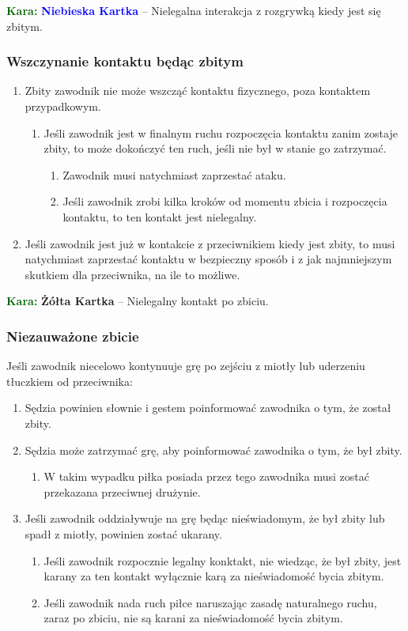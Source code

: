 \documentclass[11pt,a4paper]{article}
\newcommand\yellowcard[1]{\bgroup\textcolor{darkgreen}{\textbf{Kara: }}\bgroup\textcolor{darkyellow}{\textbf{Żółta Kartka}} -- #1}
\newcommand\bluecard[1]{\bgroup\textcolor{darkgreen}{\textbf{Kara: }}\bgroup\textcolor{blue}{\textbf{Niebieska Kartka}} -- #1}
\begin{document}
\bluecard{Nielegalna interakcja z rozgrywką kiedy jest się zbitym.}

\subsubsection{Wszczynanie kontaktu będąc zbitym}
\begin{enumerate}
  \item Zbity zawodnik nie może wszcząć kontaktu fizycznego, poza kontaktem przypadkowym.
  \begin{enumerate}
    \item Jeśli zawodnik jest w finalnym ruchu rozpoczęcia kontaktu zanim zostaje zbity, to może dokończyć ten ruch, jeśli nie był w stanie go zatrzymać.
    \begin{enumerate}
      \item Zawodnik musi natychmiast zaprzestać ataku.
      \item Jeśli zawodnik zrobi kilka kroków od momentu zbicia i rozpoczęcia kontaktu, to ten kontakt jest nielegalny.
    \end{enumerate}
  \end{enumerate}
  \item Jeśli zawodnik jest już w kontakcie z przeciwnikiem kiedy jest zbity, to musi natychmiast zaprzestać kontaktu w bezpieczny sposób i z jak najmniejszym skutkiem dla przeciwnika, na ile to możliwe.
\end{enumerate}

\yellowcard{Nielegalny kontakt po zbiciu.}

\subsubsection{Niezauważone zbicie}
Jeśli zawodnik niecelowo kontynuuje grę po zejściu z miotły lub uderzeniu tłuczkiem od przeciwnika:
\begin{enumerate}
  \item Sędzia powinien słownie i gestem poinformować zawodnika o tym, że został zbity.
  \item Sędzia może zatrzymać grę, aby poinformować zawodnika o tym, że był zbity.
  \begin{enumerate}
    \item W takim wypadku piłka posiada przez tego zawodnika musi zostać przekazana przeciwnej drużynie.
  \end{enumerate}
  \item Jeśli zawodnik oddziaływuje na grę będąc nieświadomym, że był zbity lub spadł z miotły, powinien zostać ukarany.
  \begin{enumerate}
    \item Jeśli zawodnik rozpocznie legalny konktakt, nie wiedząc, że był zbity, jest karany za ten kontakt wyłącznie karą za nieświadomość bycia zbitym.
    \item Jeśli zawodnik nada ruch piłce naruszając zasadę naturalnego ruchu, zaraz po zbiciu, nie są karani za nieświadomość bycia zbitym.
  \end{enumerate}
\end{enumerate}
\end{document}
